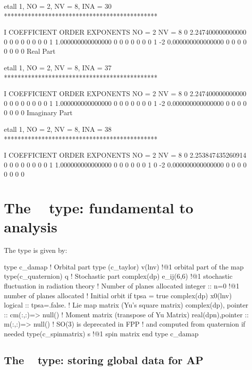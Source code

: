 \documentclass{hitec}     %
\begin{document}
{{{{{{\begin{code}
 etall    1, NO =    2, NV =    8, INA =   30
 *********************************************

    I  COEFFICIENT          ORDER   EXPONENTS
      NO =     2      NV =     8
   0   2.247400000000000       0  0  0  0  0  0  0  0
   1   1.000000000000000       0  0  0  0  0  0  0  1
    -2   0.000000000000000       0  0  0  0  0  0  0  0
  Real Part

 etall    1, NO =    2, NV =    8, INA =   37
 *********************************************

    I  COEFFICIENT          ORDER   EXPONENTS
      NO =     2      NV =     8
   0   2.247400000000000       0  0  0  0  0  0  0  0
   1   1.000000000000000       0  0  0  0  0  0  0  1
    -2   0.000000000000000       0  0  0  0  0  0  0  0
  Imaginary Part

 etall    1, NO =    2, NV =    8, INA =   38
 *********************************************

    I  COEFFICIENT          ORDER   EXPONENTS
      NO =     2      NV =     8
   0   2.253847435260914       0  0  0  0  0  0  0  0
   1   1.000000000000000       0  0  0  0  0  0  1  0
    -2   0.000000000000000       0  0  0  0  0  0  0  0
\end{code}

\section{The  ~ type: fundamental to analysis}
\label{s:cdamap}







The  type is given by:

\begin{code}
type c_damap
! Orbital part
 type (c_taylor) v(lnv) !@1 orbital part of the map
 type(c_quaternion) q
! Stochastic part
 complex(dp) e_ij(6,6) !@1 stochastic fluctuation in radiation theory
! Number of planes allocated
 integer :: n=0 !@1 number of planes allocated
!  Initial orbit if tpsa =  true
 complex(dp) x0(lnv)
 logical :: tpsa=.false.
!  Lie map matrix  (Yu's square matrix)
 complex(dp), pointer :: cm(:,:)=> null() 
!  Moment matrix (transpose of Yu Matrix)  
 real(dpn),pointer :: m(:,:)=> null()
! SO(3) is deprecated in FPP
! and computed from quaternion if needed
 type(c_spinmatrix) s !@1 spin matrix
end type c_damap
\end{code}

\subsection{The  ~ type: storing global data for AP}
\label{s:cunder}

}}}}}}
\end{document}

